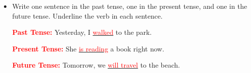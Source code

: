 \documentclass[12pt]{article}
\begin{document}
\begin{tcolorbox}[colframe=black!60, colback=white, 
coltitle=black, colbacktitle=black!15, fonttitle=\bfseries\Large, 
title=Exit Ticket, halign title=center, left=10pt, right=10pt, top=10pt, bottom=15pt]

\begin{itemize}
    \item Write one sentence in the past tense, one in the present tense, and one in the future tense. Underline the verb in each sentence.
    
\vspace{1em}

    \textcolor{red}{\textbf{Past Tense:}} Yesterday, I \underline{\textcolor{red}{walked}} to the park.  

    \textcolor{red}{\textbf{Present Tense:}} She \underline{\textcolor{red}{is reading}} a book right now.  

    \textcolor{red}{\textbf{Future Tense:}} Tomorrow, we \underline{\textcolor{red}{will travel}} to the beach.  

\end{itemize}
\end{tcolorbox}
\end{document}
